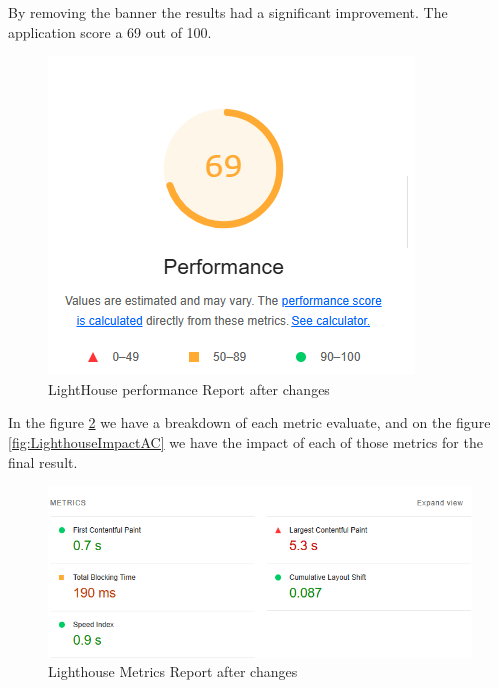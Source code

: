 \documentclass[a4paper,11pt,openright,BCOR=15mm]{scrbook}
\begin{document}
By removing the banner the results had a significant improvement. The application score a 69 out of 100.
\begin{figure}[H]
	\centering
	\includegraphics[width=.7\textwidth]{figs/Performance/Frontend/Lighthouse Performance after changes.png}
	\caption{LightHouse performance Report after changes}
	\label{fig:LightHousePerformanceAC}
\end{figure}

In the figure \ref{fig:LighthouseMetricsAC} we have a breakdown of each metric evaluate, and on the figure \ref{fig:LighthouseImpactAC} we have the impact of each of those metrics for the final result.
\begin{figure}[H]
	\centering
	\includegraphics[width=.7\textwidth]{figs/Performance/Frontend/Lighthouse Metrics after changes.png}
	\caption{Lighthouse Metrics Report after changes}
	\label{fig:LighthouseMetricsAC}
\end{figure}
\end{document}
